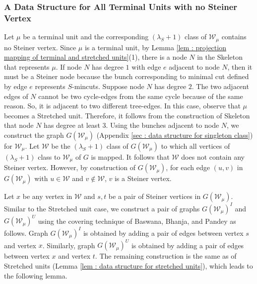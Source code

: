 \documentclass[letterpaper,11pt]{article}
\begin{document}
\subsubsection{A Data Structure for All Terminal Units with no Steiner Vertex} \label{sec : terminal unit data structure} 
Let $\mu$ be a terminal unit and the corresponding $(\lambda_S+1)$ class of ${\mathcal W}_{\mu}$ contains no Steiner vertex. Since $\mu$ is a terminal unit, by Lemma \ref{lem : projection mapping of terminal and stretched units}(1), there is a node $N$ in the Skeleton that represents $\mu$. If node $N$ has degree $1$ with edge $e$ adjacent to node $N$, then it must be a Steiner node because the bunch corresponding to minimal cut defined by edge $e$ represents $S$-mincuts. Suppose node $N$ has degree $2$. The two adjacent edges of $N$ cannot be two cycle-edges from the same cycle because of the same reason. So, it is adjacent to two different tree-edges. In this case, observe that $\mu$ becomes a Stretched unit. Therefore, it follows from the construction of Skeleton \cite{DBLP:conf/stoc/DinitzV94, DBLP:conf/soda/DinitzV95, DBLP:journals/siamcomp/DinitzV00} that node $N$ has degree at least $3$. Using the bunches adjacent to node $N$, we construct the graph $G({\mathcal W}_{\mu})$ (Appendix \ref{sec : data structure for singleton class}) for ${\mathcal W}_{\mu}$. Let ${\mathcal W}$ be the $(\lambda_S+1)$ class of $G({\mathcal W}_{\mu})$ to which all vertices of $(\lambda_S+1)$ class to ${\mathcal W}_{\mu}$ of $G$ is mapped. It follows that ${\mathcal W}$ does not contain any Steiner vertex. However, by construction of $G({\mathcal W}_{\mu})$, for each edge $(u,v)$ in $G({\mathcal W}_{\mu})$ with $u\in {\mathcal W}$ and $v\notin {\mathcal W}$, $v$ is a Steiner vertex. 

Let $x$ be any vertex in ${\mathcal W}$ and $s,t$ be a pair of Steiner vertices in $G({\mathcal W}_{\mu})$. Similar to the Stretched unit case, we construct a pair of graphs $G({\mathcal W}_{\mu})^I$ and $G({\mathcal W}_{\mu})^U$ using the covering technique of Baswana, Bhanja, and Pandey \cite{DBLP:journals/talg/BaswanaBP23} as follows. Graph $G({\mathcal W}_{\mu})^I$ is obtained by adding a pair of edges between vertex $s$ and vertex $x$. Similarly, graph $G({\mathcal W}_{\mu})^U$ is obtained by adding a pair of edges between vertex $x$ and vertex $t$. The remaining construction is the same as of Stretched units (Lemma \ref{lem : data structure for stretched units}), which leads to the following lemma.
\end{document}
